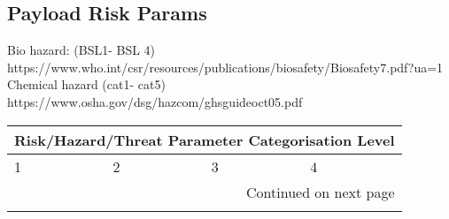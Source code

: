 \documentclass{ua_wgs_base}
\begin{document}
\subsection{Payload Risk Params}
Bio hazard: (BSL1- BSL 4) https://www.who.int/csr/resources/publications/biosafety/Biosafety7.pdf?ua=1 \\
Chemical hazard (cat1- cat5) https://www.osha.gov/dsg/hazcom/ghsguideoct05.pdf


\begin{centering}
\small
  \ttfamily
\begin{longtable}{|l|l|l|l|}
 \hline
 \multicolumn{4}{|c|}{Risk/Hazard/Threat Parameter Categorisation Level} \\
 \hline
 1 & 2 & 3 & 4 \\
 \hline
  \endhead
  \hline \multicolumn{4}{|r|}{{Continued on next page}} \\ \hline
  \endfoot
  \hline
  \endlastfoot


\end{longtable}
\end{centering}
\end{document}
